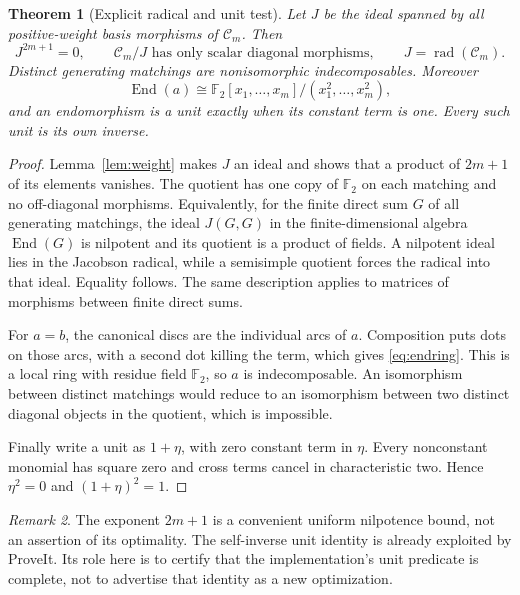 \documentclass[11pt]{article}
\newtheorem{theorem}{Theorem}[section]
\theoremstyle{definition}\newtheorem{definition}[theorem]{Definition}
\theoremstyle{remark}\newtheorem{remark}[theorem]{Remark}
\newcommand{\F}{\mathbb F_2}
\newcommand{\End}{\operatorname{End}}
\newcommand{\rad}{\operatorname{rad}}
\begin{document}
\begin{theorem}[Explicit radical and unit test]\label{thm:radical}
Let $J$ be the ideal spanned by all positive-weight basis morphisms of $\mathcal C_m$. Then
\[
 J^{2m+1}=0,\qquad
 \mathcal C_m/J\text{ has only scalar diagonal morphisms},
 \qquad J=\rad(\mathcal C_m).
\]
Distinct generating matchings are nonisomorphic indecomposables. Moreover
\begin{equation}
 \End(a)\cong\F[x_1,\ldots,x_m]/(x_1^2,\ldots,x_m^2),\label{eq:endring}
\end{equation}
and an endomorphism is a unit exactly when its constant term is one. Every such unit is its own inverse.
\end{theorem}
\begin{proof}
Lemma~\ref{lem:weight} makes $J$ an ideal and shows that a product of $2m+1$ of its elements vanishes. The quotient has one copy of $\F$ on each matching and no off-diagonal morphisms. Equivalently, for the finite direct sum $G$ of all generating matchings, the ideal $J(G,G)$ in the finite-dimensional algebra $\End(G)$ is nilpotent and its quotient is a product of fields. A nilpotent ideal lies in the Jacobson radical, while a semisimple quotient forces the radical into that ideal. Equality follows. The same description applies to matrices of morphisms between finite direct sums.

For $a=b$, the canonical discs are the individual arcs of $a$. Composition puts dots on those arcs, with a second dot killing the term, which gives \eqref{eq:endring}. This is a local ring with residue field $\F$, so $a$ is indecomposable. An isomorphism between distinct matchings would reduce to an isomorphism between two distinct diagonal objects in the quotient, which is impossible.

Finally write a unit as $1+\eta$, with zero constant term in $\eta$. Every nonconstant monomial has square zero and cross terms cancel in characteristic two. Hence $\eta^2=0$ and $(1+\eta)^2=1$.
\end{proof}

\begin{remark}
The exponent $2m+1$ is a convenient uniform nilpotence bound, not an assertion of its optimality. The self-inverse unit identity is already exploited by ProveIt. Its role here is to certify that the implementation's unit predicate is complete, not to advertise that identity as a new optimization.
\end{remark}
\end{document}
